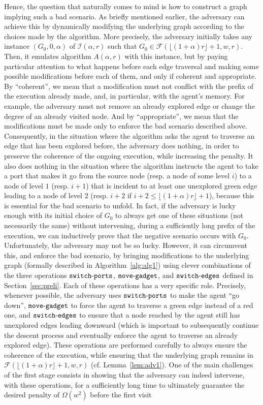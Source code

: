 \documentclass[11pt]{article}
\begin{document}
Hence, the question that naturally comes to mind is how to construct a graph implying such a bad scenario. As briefly mentioned earlier, the adversary can achieve this by dynamically modifying the underlying graph according to the choices made by the algorithm. More precisely, the adversary initially takes any instance $(G_0,0,\alpha)$ of $\mathcal{I}(\alpha, r)$ such that $G_0\in \mathcal{F}(\lfloor(1+\alpha)r\rfloor+1,w,r)$. Then, it emulates algorithm $A(\alpha, r)$ with this instance, but by paying particular attention to what happens before each edge traversal and making some possible modifications before each of them, and only if coherent and appropriate. By ``coherent'', we mean that a modification must not conflict with the prefix of the execution already made, and, in particular, with the agent's memory. For example, the adversary must not remove an already explored edge or change the degree of an already visited node. And by ``appropriate'', we mean that the modifications must be made only to enforce the bad scenario described above. Consequently, in the situation where the algorithm asks the agent to traverse an edge that has been explored before, the adversary does nothing, in order to preserve the coherence of the ongoing execution, while increasing the penalty. It also does nothing in the situation where the algorithm instructs the agent to take a port that makes it go from the source node (resp. a node of some level $i$) to a node of level $1$ (resp. $i+1$) that is incident to at least one unexplored green edge leading to a node of level $2$ (resp. $i+2$ if $i+2\leq \lfloor(1+\alpha)r\rfloor+1$), because this is essential for the bad scenario to unfold. In fact, if the adversary is lucky enough with its initial choice of $G_0$ to always get one of these situations (not necessarily the same) without intervening, during a sufficiently long prefix of the execution, we can inductively prove that the negative scenario occurs with $G_0$. Unfortunately, the adversary may not be so lucky. However, it can circumvent this, and enforce the bad scenario, by bringing modifications to the underlying graph (formally described in Algorithm~\ref{alg:alg1}) using clever combinations of the three operations ${\tt switch\mbox{-}ports}$, ${\tt move\mbox{-}gadget}$, and ${\tt switch\mbox{-}edges}$ defined in Section~\ref{sec:preli}. Each of these operations has a very specific role. Precisely, whenever possible, the adversary uses ${\tt switch\mbox{-}ports}$ to make the agent ``go down'', ${\tt move\mbox{-}gadget}$ to force the agent to traverse a green edge instead of a red one, and ${\tt switch\mbox{-}edges}$ to ensure that a node reached by the agent still has unexplored edges leading downward (which is important to subsequently continue the descent process and eventually enforce the agent to traverse an already explored edge). These operations are performed carefully to always ensure the coherence of the execution, while ensuring that the underlying graph remains in $\mathcal{F}(\lfloor(1+\alpha)r\rfloor+1,w,r)$ (cf. Lemma~\ref{lem:adv1}). One of the main challenges of the first stage consists in showing that the adversary can indeed intervene, with these operations, for a sufficiently long time to ultimately guarantee the desired penalty of $\Omega(w^2)$ before the first visit 
\end{document}
